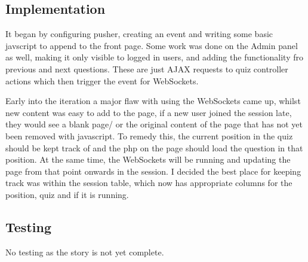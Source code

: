 \documentclass{article}
\begin{document}
\subsection{Implementation}
It began by configuring pusher, creating an event and writing some basic javscript to append to the front page. Some work was done on the Admin panel as well, making it only visible to logged in users, and adding the functionality fro previous and next questions. These are just AJAX requests to quiz controller actions which then trigger the event for WebSockets.

Early into the iteration a major flaw with using the WebSockets came up, whilst new content was easy to add to the page, if a new user joined the session late, they would see a blank page/ or the original content of the page that has not yet been removed with javascript. To remedy this, the current position in the quiz should be kept track of and the php on the page should load the question in that position. At the same time, the WebSockets will be running and updating the page from that point onwards in the session. I decided the best place for keeping track was within the session table, which now has appropriate columns for the position, quiz and if it is running.
\subsection{Testing}
No testing as the story is not yet complete.
\newpage

%
%
\end{document}
